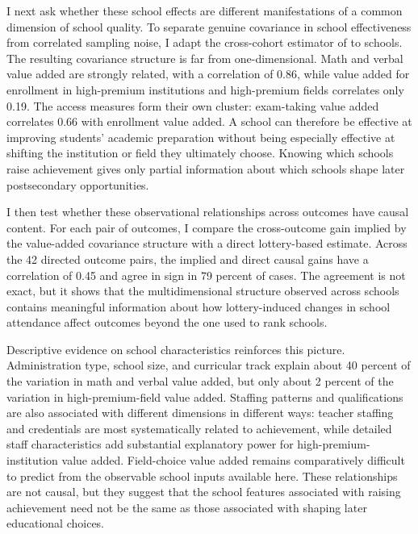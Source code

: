 \documentclass[a4paper, article, english, oneside, unknownkeysallowed, 12pt]{memoir}
\begin{document}
I next ask whether these school effects are different manifestations of a common dimension of school quality.
To separate genuine covariance in school effectiveness from correlated sampling noise, I adapt the cross-cohort estimator of \textcite{rose_effects_2022} to schools.
The resulting covariance structure is far from one-dimensional.
Math and verbal value added are strongly related, with a correlation of 0.86, while value added for enrollment in high-premium institutions and high-premium fields correlates only 0.19.
The access measures form their own cluster: exam-taking value added correlates 0.66 with enrollment value added.
A school can therefore be effective at improving students' academic preparation without being especially effective at shifting the institution or field they ultimately choose.
Knowing which schools raise achievement gives only partial information about which schools shape later postsecondary opportunities.
 
I then test whether these observational relationships across outcomes have causal content.
For each pair of outcomes, I compare the cross-outcome gain implied by the value-added covariance structure with a direct lottery-based estimate.
Across the 42 directed outcome pairs, the implied and direct causal gains have a correlation of 0.45 and agree in sign in 79 percent of cases.
The agreement is not exact, but it shows that the multidimensional structure observed across schools contains meaningful information about how lottery-induced changes in school attendance affect outcomes beyond the one used to rank schools.
 
Descriptive evidence on school characteristics reinforces this picture.
Administration type, school size, and curricular track explain about 40 percent of the variation in math and verbal value added, but only about 2 percent of the variation in high-premium-field value added.
Staffing patterns and qualifications are also associated with different dimensions in different ways: teacher staffing and credentials are most systematically related to achievement, while detailed staff characteristics add substantial explanatory power for high-premium-institution value added.
Field-choice value added remains comparatively difficult to predict from the observable school inputs available here.
These relationships are not causal, but they suggest that the school features associated with raising achievement need not be the same as those associated with shaping later educational choices.
 
\end{document}
